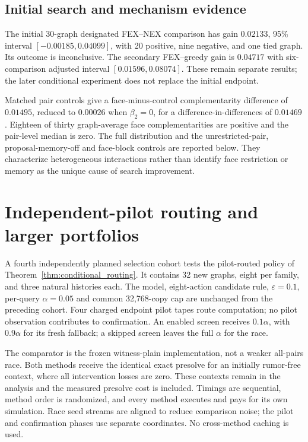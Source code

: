 \documentclass[preprint,11pt,sort&compress]{elsarticle}
\begin{document}
\subsection{Initial search and mechanism evidence}
The initial 30-graph designated FEX--NEX comparison has gain $0.02133$, 95\% interval $[-0.00185,0.04099]$, with 20 positive, nine negative, and one tied graph. Its outcome is inconclusive. The secondary FEX--greedy gain is $0.04717$ with six-comparison adjusted interval $[0.01596,0.08074]$. These remain separate results; the later conditional experiment does not replace the initial endpoint.

Matched pair controls give a face-minus-control complementarity difference of $0.01495$, reduced to $0.00026$ when $\beta_2=0$, for a difference-in-differences of $0.01469$. Eighteen of thirty graph-average face complementarities are positive and the pair-level median is zero. The full distribution and the unrestricted-pair, proposal-memory-off and face-block controls are reported below. They characterize heterogeneous interactions rather than identify face restriction or memory as the unique cause of search improvement.

\FloatBarrier\section{Independent-pilot routing and larger portfolios}
\label{sec:adaptive_study}
A fourth independently planned selection cohort tests the pilot-routed policy
of Theorem~\ref{thm:conditional_routing}. It contains 32 new graphs, eight per
family, and three natural histories each. The model, eight-action candidate
rule, $\varepsilon=0.1$, per-query $\alpha=0.05$ and common 32,768-copy cap
are unchanged from the preceding cohort. Four charged endpoint pilot tapes
route computation; no pilot observation contributes to confirmation. An
enabled screen receives $0.1\alpha$, with $0.9\alpha$ for its fresh fallback;
a skipped screen leaves the full $\alpha$ for the race.

The comparator is the frozen witness-plain implementation, not a weaker
all-pairs race. Both methods receive the identical exact presolve for an
initially rumor-free context, where all intervention losses are zero.
These contexts remain in the analysis and the measured presolve cost is
included. Timings are sequential, method order is randomized, and every
method executes and pays for its own simulation. Race seed streams are
aligned to reduce comparison noise; the pilot and confirmation phases use
separate coordinates. No cross-method caching is used.
\end{document}
